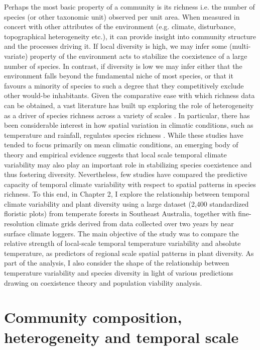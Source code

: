 Perhaps the most basic property of a community is its richness i.e. the number of species (or other taxonomic unit) observed per unit area. When measured in concert with other attributes of the environment (e.g. climate, disturbance, topographical heterogeneity etc.), it can provide insight into community structure and the processes driving it. If local diversity is high, we may infer some (multi-variate) property of the environment acts to stabilize the coexistence of a large number of species. In contrast, if diversity is low we may infer either that the environment falls beyond the fundamental niche of most species, or that it favours a minority of species to such a degree that they competitively exclude other would-be inhabitants. Given the comparative ease with which richness data can be obtained, a vast literature has built up exploring the role of heterogeneity as a driver of species richness across a variety of scales \citep[reviewed in][]{Stein2014}. In particular, there has been considerable interest in how spatial variation in climatic conditions, such as temperature and rainfall, regulates species richness \citep[e.g.][]{O'Brien1998, Francis2003, Currie2004, Kozak2012}. While these studies have tended to focus primarily on mean climatic conditions, an emerging body of theory and empirical evidence suggests that local scale temporal climate variability may also play an important role in stabilizing species coexistence and thus fostering diversity. Nevertheless, few studies have compared the predictive capacity of temporal climate variability with respect to spatial patterns in species richness. To this end, in Chapter 2, I explore the relationship between temporal climate variability and plant diversity using a large dataset (2,400 standardized floristic plots) from temperate forests in Southeast Australia, together with fine-resolution climate grids derived from data collected over two years by near surface climate loggers. The main objective of the study was to compare the relative strength of local-scale temporal temperature variability and absolute temperature, as predictors of regional scale spatial patterns in plant diversity. As part of the analysis, I also consider the shape of the relationship between temperature variability and species diversity in light of various predictions drawing on coexistence theory and population viability analysis.

\section{Community composition, heterogeneity and temporal scale}

